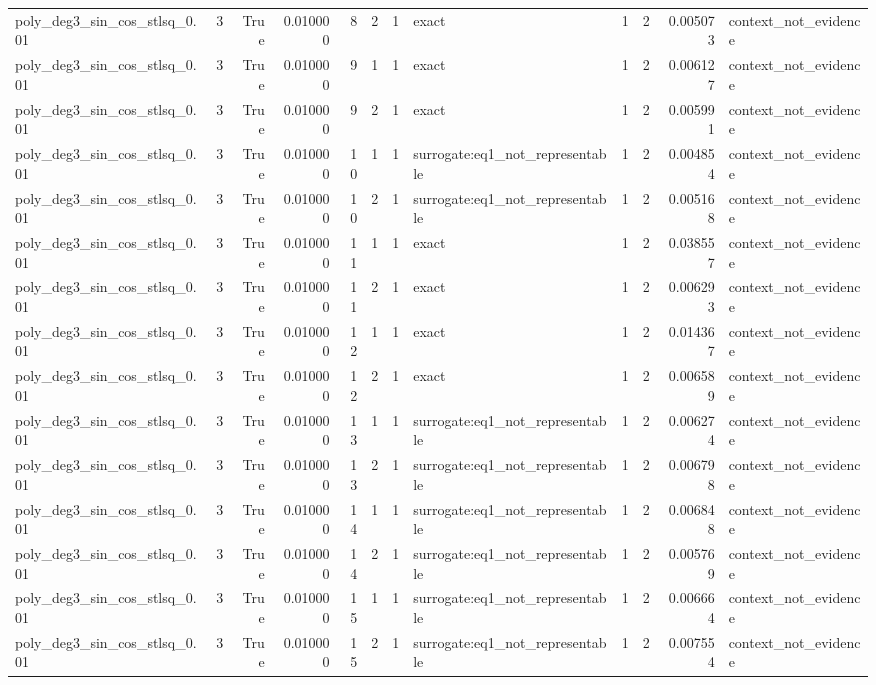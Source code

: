 \begin{tabular}{lrrrrrrlrrrl}
poly\_deg3\_sin\_cos\_stlsq\_0.01 & 3 & True & 0.010000 & 8 & 2 & 1 & exact & 1 & 2 & 0.005073 & context\_not\_evidence \\
poly\_deg3\_sin\_cos\_stlsq\_0.01 & 3 & True & 0.010000 & 9 & 1 & 1 & exact & 1 & 2 & 0.006127 & context\_not\_evidence \\
poly\_deg3\_sin\_cos\_stlsq\_0.01 & 3 & True & 0.010000 & 9 & 2 & 1 & exact & 1 & 2 & 0.005991 & context\_not\_evidence \\
poly\_deg3\_sin\_cos\_stlsq\_0.01 & 3 & True & 0.010000 & 10 & 1 & 1 & surrogate:eq1\_not\_representable & 1 & 2 & 0.004854 & context\_not\_evidence \\
poly\_deg3\_sin\_cos\_stlsq\_0.01 & 3 & True & 0.010000 & 10 & 2 & 1 & surrogate:eq1\_not\_representable & 1 & 2 & 0.005168 & context\_not\_evidence \\
poly\_deg3\_sin\_cos\_stlsq\_0.01 & 3 & True & 0.010000 & 11 & 1 & 1 & exact & 1 & 2 & 0.038557 & context\_not\_evidence \\
poly\_deg3\_sin\_cos\_stlsq\_0.01 & 3 & True & 0.010000 & 11 & 2 & 1 & exact & 1 & 2 & 0.006293 & context\_not\_evidence \\
poly\_deg3\_sin\_cos\_stlsq\_0.01 & 3 & True & 0.010000 & 12 & 1 & 1 & exact & 1 & 2 & 0.014367 & context\_not\_evidence \\
poly\_deg3\_sin\_cos\_stlsq\_0.01 & 3 & True & 0.010000 & 12 & 2 & 1 & exact & 1 & 2 & 0.006589 & context\_not\_evidence \\
poly\_deg3\_sin\_cos\_stlsq\_0.01 & 3 & True & 0.010000 & 13 & 1 & 1 & surrogate:eq1\_not\_representable & 1 & 2 & 0.006274 & context\_not\_evidence \\
poly\_deg3\_sin\_cos\_stlsq\_0.01 & 3 & True & 0.010000 & 13 & 2 & 1 & surrogate:eq1\_not\_representable & 1 & 2 & 0.006798 & context\_not\_evidence \\
poly\_deg3\_sin\_cos\_stlsq\_0.01 & 3 & True & 0.010000 & 14 & 1 & 1 & surrogate:eq1\_not\_representable & 1 & 2 & 0.006848 & context\_not\_evidence \\
poly\_deg3\_sin\_cos\_stlsq\_0.01 & 3 & True & 0.010000 & 14 & 2 & 1 & surrogate:eq1\_not\_representable & 1 & 2 & 0.005769 & context\_not\_evidence \\
poly\_deg3\_sin\_cos\_stlsq\_0.01 & 3 & True & 0.010000 & 15 & 1 & 1 & surrogate:eq1\_not\_representable & 1 & 2 & 0.006664 & context\_not\_evidence \\
poly\_deg3\_sin\_cos\_stlsq\_0.01 & 3 & True & 0.010000 & 15 & 2 & 1 & surrogate:eq1\_not\_representable & 1 & 2 & 0.007554 & context\_not\_evidence \\

\end{tabular}
